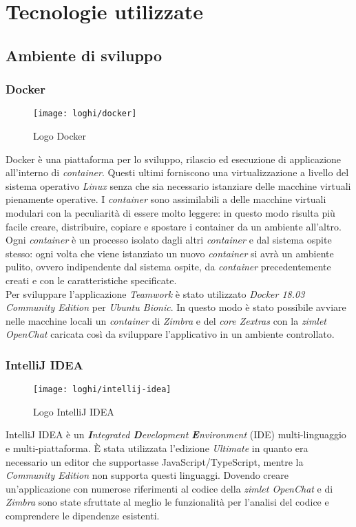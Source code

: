 
\chapter{Tecnologie utilizzate}\label{chap:tec}
\section{Ambiente di sviluppo}
\subsection{Docker}
	\begin{figure}[H] 
		\centering
		\texttt{[image: loghi/docker]}
		\caption{Logo Docker}
	\end{figure}
Docker è una piattaforma per lo sviluppo, rilascio ed esecuzione di applicazione 
all'interno di \emph{container}. Questi ultimi forniscono una virtualizzazione a livello 
del sistema operativo \emph{Linux} senza che sia necessario istanziare delle macchine 
virtuali pienamente operative.
I \emph{container} sono assimilabili a delle macchine virtuali modulari con la peculiarità 
di essere molto leggere: in questo modo risulta più facile creare, distribuire, 
copiare e spostare i container da un ambiente all'altro.
Ogni \emph{container} è un processo isolato dagli altri \emph{container} e dal sistema ospite stesso: ogni volta che viene istanziato un nuovo \emph{container} si avrà un ambiente pulito, ovvero indipendente dal sistema ospite, da \emph{container} precedentemente creati e con le caratteristiche specificate. \\
Per sviluppare l'applicazione \emph{Teamwork} è stato utilizzato \emph{Docker 18.03 Community Edition} per \emph{Ubuntu Bionic}. In questo modo è stato possibile avviare nelle macchine locali un \emph{container} di \emph{Zimbra} e del \emph{core Zextras} con la \emph{zimlet OpenChat} caricata così da sviluppare l'applicativo in un ambiente controllato.

\subsection{IntelliJ IDEA} \label{subsec:IntelliJ}
	\begin{figure}[H] 
		\centering
		\texttt{[image: loghi/intellij-idea]}
		\caption{Logo IntelliJ IDEA}
	\end{figure}
IntelliJ IDEA è un \emph{\textbf{I}ntegrated \textbf{D}evelopment \textbf{E}nvironment} (\acrshort{IDE}) multi-linguaggio e multi-piattaforma. 
È stata utilizzata l'edizione \emph{Ultimate} in quanto era necessario un editor che 
supportasse JavaScript/TypeScript, mentre la \emph{Community Edition} non supporta questi linguaggi. 
Dovendo creare un'applicazione con numerose riferimenti al codice della \emph{zimlet 
OpenChat} e di \emph{Zimbra} sono state sfruttate al meglio le funzionalità per 
l'analisi del codice e comprendere le dipendenze esistenti.

